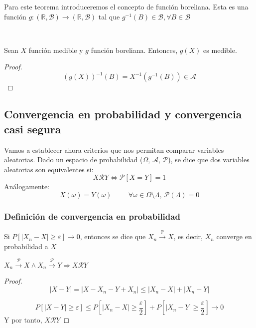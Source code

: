 Para este teorema introduceremos el concepto de función boreliana. Esta es una función $g:(\mathbb{R},\mathcal{B})\to(\mathbb{R},\mathcal{B})$ tal que $g^{-1}(B)\in \mathcal{B}, \forall B\in\mathcal{B}$

\begin{theorem}
  \
  
Sean $X$ función medible y $g$ función boreliana. Entonces, $g(X)$ es medible.
\end{theorem}

\begin{proof}
$$(g(X))^{-1}(B)=X^{-1}(g^{-1}(B))\in \mathcal{A}$$

\end{proof}

\subsection{Convergencia en probabilidad y convergencia casi segura}

Vamos a establecer ahora criterios que nos permitan comparar variables aleatorias. Dado un espacio de probabilidad ($\Omega$, $\mathcal{A}$, $\mathcal{P}$), se dice que dos variables aleatorias son equivalentes si:
$$ X\mathcal{R}Y \Leftrightarrow \mathcal{P}[X = Y] = 1$$
Análogamente:
$$X(\omega) = Y(\omega) \hspace{1cm} \forall \omega \in \Omega \setminus \Lambda, \  \mathcal{P}(\Lambda) = 0$$

\subsubsection{Definición de convergencia en probabilidad}

Si $P[|X_n- X| \geq \varepsilon]\rightarrow 0$, entonces se dice que $X_n\stackrel{\mathbb{P}}{\longrightarrow} X$, es decir, $X_n$ converge en probabilidad a $X$\\

\begin{lemma}
$X_n\stackrel{\mathcal{P}}{\longrightarrow} X \wedge X_n\stackrel{\mathcal{P}}{\longrightarrow} Y \Longrightarrow X\mathcal{R}Y$\\
\end{lemma}

\begin{proof}
$$|X-Y |=|X - X_n - Y + X_n | \leq |X_n - X|+| X_n-Y |$$

$$P[|X - Y| \geq \varepsilon] \leq P[|X_n - X | \geq \frac{\varepsilon}{2} ] + P[| X_n - Y | \geq \frac{\varepsilon}{2}] \rightarrow 0$$
Y por tanto, $X \mathcal{R} Y$


\end{proof}

